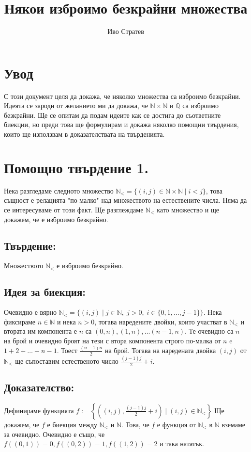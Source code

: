 \documentclass[a4paper, 12pt, oneside]{article}
\title{Някои изброимо безкрайни множества}
\author{Иво Стратев}
\newcommand{\N}{\mathbb{N}}
\newcommand{\Q}{\mathbb{Q}}
\newcommand{\LN}{\N_<}
\begin{document}
\maketitle
\section*{Увод}
С този документ целя да докажа, че няколко множества са изброимо безкрайни.
Идеята се зароди от желанието ми да докажа, че \(\N\times\N\) и \(\Q\) са изброимо безкрайни.
Ще се опитам да подам идеите как се достига до съответните биекции,
но преди това ще формулирам и докажа няколко помощни твърдения, които ще използвам в доказателствата на твърденията.
\section*{Помощно твърдение 1.}
Нека разгледаме следното множество \(\LN = \{(i, j) \in \N\times\N \; | \; i < j\}\),
това същност е релацията "по-малко" над множеството на естествените числа.
Няма да се интересуваме от този факт. Ще разглеждаме \(\LN\) като множество и ще докажем,
че е изброимо безкрайно.
\subsection*{Твърдение:}
Множеството \(\LN\) е изброимо безкрайно.
\subsection*{Идея за биекция:}
Очевидно е вярно \(\LN = \{(i, j) \; | \; j \in \N, \; j > 0, \; i \in \{0, 1, \dots, j - 1\}\}\).
Нека фиксираме \(n \in \N\) и нека \(n > 0\), тогава наредените двойки, които участват в \(\LN\)
и втората им компонента е \(n\) са \((0, n), (1, n), \dots (n - 1, n)\).
Те очевидно са \(n\) на брой и очевидно броят на тези с втора компонента строго по-малка от \(n\)
e \(1 + 2 + \dots + n - 1\). Тоест \(\displaystyle\frac{(n - 1)n}{2}\) на брой.
Тогава на наредената двойка \((i, j)\) от \(\LN\) ще съпоставим естественото число \(\displaystyle\frac{(j - 1)j}{2} + i\). \\
\subsection*{Доказателство:}
Дефинираме функцията \(f := \left\{\left((i, j), \displaystyle\frac{(j - 1)j}{2} + i\right) \; \Big| \; (i, j) \in \LN \right\}\)
Ще докажем, че \(f\) е биекция между \(\LN\) и \(\N\). Това, че \(f\) е функция от \(\LN\) в \(\N\) вземаме за очевидно.
Очевидно е също, че \(f((0, 1)) = 0, f((0, 2)) = 1, f((1, 2)) = 2\) и така нататък.
\end{document}
